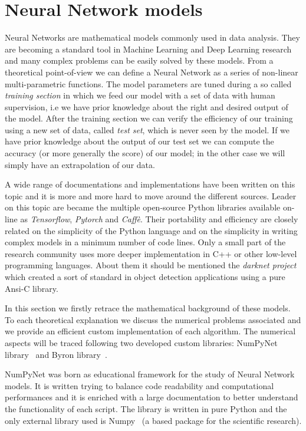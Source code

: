 \documentclass{standalone}
\begin{document}
\section[Neural Network models]{Neural Network models}\label{nn}

Neural Networks are mathematical models commonly used in data analysis.
They are becoming a standard tool in Machine Learning and Deep Learning research and many complex problems can be easily solved by these models.
From a theoretical point-of-view we can define a Neural Network as a series of non-linear multi-parametric functions.
The model parameters are tuned during a so called \emph{training section} in which we feed our model with a set of data with human supervision, i.e we have prior knowledge about the right and desired output of the model.
After the training section we can verify the efficiency of our training using a new set of data, called \emph{test set}, which is never seen by the model.
If we have prior knowledge about the output of our test set we can compute the accuracy (or more generally the score) of our model; in the other case we will simply have an extrapolation of our data.

A wide range of documentations and implementations have been written on this topic and it is more and more hard to move around the different sources.
Leader on this topic are became the multiple open-source Python libraries available on-line as \emph{Tensorflow}, \emph{Pytorch} and \emph{Caffè}.%
Their portability and efficiency are closely related on the simplicity of the Python language and on the simplicity in writing complex models in a minimum number of code lines.
Only a small part of the research community uses more deeper implementation in C++ or other low-level programming languages.
About them it should be mentioned the \emph{darknet project} which created a sort of standard in object detection applications using a pure Ansi-C library.

In this section we firstly retrace the mathematical background of these models.
To each theoretical explanation we discuss the numerical problems associated and we provide an efficient custom implementation of each algorithm.
The numerical aspects will be traced following two  developed custom libraries: NumPyNet library~\cite{NumPyNet} and Byron library~\cite{Byron}.

NumPyNet was born as educational framework for the study of Neural Network models.
It is written trying to balance code readability and computational performances and it is enriched with a large documentation to better understand the functionality of each script.
The library is written in pure Python and the only external library used is Numpy~\cite{Numpy} (a based package for the scientific research).
\end{document}

